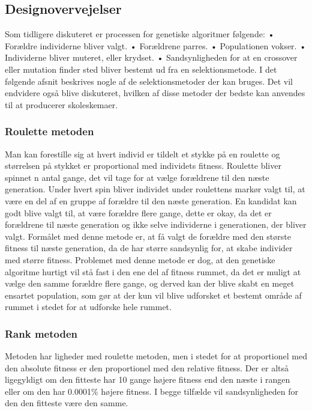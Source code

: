 \subsection{Designovervejelser}

Som tidligere diskuteret er processen for genetiske algoritmer følgende:
•	Forældre individerne bliver valgt.
•	Forældrene parres.
•	Populationen vokser.
•	Individerne bliver muteret, eller krydset.
•	Sandsynligheden for at en crossover eller mutation finder sted bliver bestemt ud fra en selektionsmetode.
I det følgende afsnit beskrives nogle af de selektionsmetoder der kan bruges. Det vil endvidere også blive diskuteret, hvilken af disse metoder der bedste kan anvendes til at producerer skoleskemaer.

\subsubsection{Roulette metoden}

Man kan forestille sig at hvert individ er tildelt et stykke på en roulette og størrelsen på stykket er proportional med individets fitness. Roulette bliver spinnet n antal gange, det vil tage for at vælge forældrene til den næste generation. Under hvert spin bliver individet under roulettens markør valgt til, at være en del af en gruppe af forældre til den næste generation. En kandidat kan godt blive valgt til, at være forældre flere gange, dette er okay, da det er forældrene til næste generation og ikke selve individerne i generationen, der bliver valgt. Formålet med denne metode er, at få valgt de forældre med den største fitness til næste generation, da de har større sandsynlig for, at skabe individer med større fitness. Problemet med denne metode er dog, at den genetiske algoritme hurtigt vil stå fast i den ene del af fitness rummet, da det er muligt at vælge den samme forældre flere gange, og derved kan der blive skabt en meget ensartet population, som gør at der kun vil blive udforsket et bestemt område af rummet i stedet for at udforske hele rummet.

\subsubsection{Rank metoden}

Metoden har ligheder med roulette metoden, men i stedet for at proportionel med den absolute fitness er den proportionel med den relative fitness. Der er altså ligegyldigt om den fitteste har 10 gange højere fitness end den næste i rangen eller om den har 0.0001\% højere fitness. I begge tilfælde vil sandsynligheden for den den fitteste være den samme.

